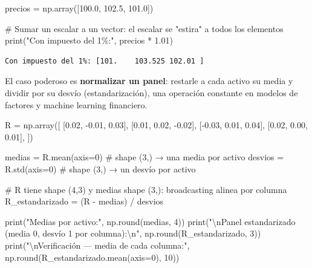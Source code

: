 \documentclass[
  spanish,
  letterpaper,
  DIV=11,
  numbers=noendperiod]{scrreprt}
\newenvironment{Shaded}{\begin{snugshade}}{\end{snugshade}}
\newcommand{\BuiltInTok}[1]{\textcolor[rgb]{0.00,0.23,0.31}{#1}}
\newcommand{\CharTok}[1]{\textcolor[rgb]{0.13,0.47,0.30}{#1}}
\newcommand{\CommentTok}[1]{\textcolor[rgb]{0.37,0.37,0.37}{#1}}
\newcommand{\DecValTok}[1]{\textcolor[rgb]{0.68,0.00,0.00}{#1}}
\newcommand{\FloatTok}[1]{\textcolor[rgb]{0.68,0.00,0.00}{#1}}
\newcommand{\NormalTok}[1]{\textcolor[rgb]{0.00,0.23,0.31}{#1}}
\newcommand{\OperatorTok}[1]{\textcolor[rgb]{0.37,0.37,0.37}{#1}}
\newcommand{\StringTok}[1]{\textcolor[rgb]{0.13,0.47,0.30}{#1}}
\begin{document}
\label{broadcast-escalar}
\begin{Shaded}
\begin{Highlighting}[]
\NormalTok{precios }\OperatorTok{=}\NormalTok{ np.array([}\FloatTok{100.0}\NormalTok{, }\FloatTok{102.5}\NormalTok{, }\FloatTok{101.0}\NormalTok{])}

\CommentTok{\# Sumar un escalar a un vector: el escalar se "estira" a todos los elementos}
\BuiltInTok{print}\NormalTok{(}\StringTok{"Con impuesto del 1\%:"}\NormalTok{, precios }\OperatorTok{*} \FloatTok{1.01}\NormalTok{)}
\end{Highlighting}
\end{Shaded}

\begin{verbatim}
Con impuesto del 1%: [101.    103.525 102.01 ]
\end{verbatim}

El caso poderoso es \textbf{normalizar un panel}: restarle a cada activo
su media y dividir por su desvío (estandarización), una operación
constante en modelos de factores y machine learning financiero.

\label{broadcast-panel}
\begin{Shaded}
\begin{Highlighting}[]
\NormalTok{R }\OperatorTok{=}\NormalTok{ np.array([}
\NormalTok{    [}\FloatTok{0.02}\NormalTok{, }\OperatorTok{{-}}\FloatTok{0.01}\NormalTok{,  }\FloatTok{0.03}\NormalTok{],}
\NormalTok{    [}\FloatTok{0.01}\NormalTok{,  }\FloatTok{0.02}\NormalTok{, }\OperatorTok{{-}}\FloatTok{0.02}\NormalTok{],}
\NormalTok{    [}\OperatorTok{{-}}\FloatTok{0.03}\NormalTok{, }\FloatTok{0.01}\NormalTok{,  }\FloatTok{0.04}\NormalTok{],}
\NormalTok{    [}\FloatTok{0.02}\NormalTok{,  }\FloatTok{0.00}\NormalTok{,  }\FloatTok{0.01}\NormalTok{],}
\NormalTok{])}

\NormalTok{medias }\OperatorTok{=}\NormalTok{ R.mean(axis}\OperatorTok{=}\DecValTok{0}\NormalTok{)   }\CommentTok{\# shape (3,) → una media por activo}
\NormalTok{desvios }\OperatorTok{=}\NormalTok{ R.std(axis}\OperatorTok{=}\DecValTok{0}\NormalTok{)   }\CommentTok{\# shape (3,) → un desvío por activo}

\CommentTok{\# R tiene shape (4,3) y medias shape (3,): broadcasting alinea por columna}
\NormalTok{R\_estandarizado }\OperatorTok{=}\NormalTok{ (R }\OperatorTok{{-}}\NormalTok{ medias) }\OperatorTok{/}\NormalTok{ desvios}

\BuiltInTok{print}\NormalTok{(}\StringTok{"Medias por activo:"}\NormalTok{, np.}\BuiltInTok{round}\NormalTok{(medias, }\DecValTok{4}\NormalTok{))}
\BuiltInTok{print}\NormalTok{(}\StringTok{"}\CharTok{\textbackslash{}n}\StringTok{Panel estandarizado (media 0, desvío 1 por columna):}\CharTok{\textbackslash{}n}\StringTok{"}\NormalTok{,}
\NormalTok{      np.}\BuiltInTok{round}\NormalTok{(R\_estandarizado, }\DecValTok{3}\NormalTok{))}
\BuiltInTok{print}\NormalTok{(}\StringTok{"}\CharTok{\textbackslash{}n}\StringTok{Verificación — media de cada columna:"}\NormalTok{, np.}\BuiltInTok{round}\NormalTok{(R\_estandarizado.mean(axis}\OperatorTok{=}\DecValTok{0}\NormalTok{), }\DecValTok{10}\NormalTok{))}
\end{Highlighting}
\end{Shaded}
\end{document}
